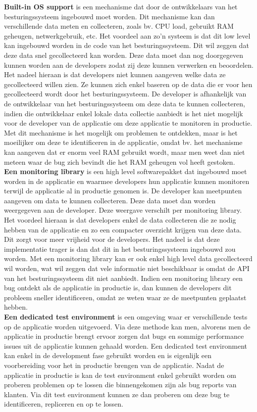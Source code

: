 \textbf{Built-in OS support} is een mechanisme dat door de ontwikkelaars van het besturingssysteem ingebouwd moet worden. Dit mechanisme kan dan verschillende data meten en collecteren, zoals bv. CPU load, gebruikt RAM geheugen, netwerkgebruik, etc. Het voordeel aan zo'n systeem is dat dit low level kan ingebouwd worden in de code van het besturingssysteem. Dit wil zeggen dat deze data snel gecollecteerd kan worden. Deze data moet dan nog doorgegeven kunnen worden aan de developers zodat zij deze kunnen verwerken en beoordelen. Het nadeel hieraan is dat developers niet kunnen aangeven welke data ze gecollecteerd willen zien. Ze kunnen zich enkel baseren op de data die er voor hen gecollecteerd wordt door het besturingssysteem. De developer is afhankelijk van de ontwikkelaar van het besturingssysteem om deze data te kunnen collecteren, indien die ontwikkelaar enkel lokale data collectie aanbiedt is het niet mogelijk voor de developer van de applicatie om deze applicatie te monitoren in productie. Met dit mechanisme is het mogelijk om problemen te ontdekken, maar is het moeilijker om deze te identificeren in de applicatie, omdat bv. het mechanisme kan aangeven dat er enorm veel RAM gebruikt wordt, maar men weet dan niet meteen waar de bug zich bevindt die het RAM geheugen vol heeft gestoken.\\

\textbf{Een monitoring library} is een high level softwarepakket dat ingebouwd moet worden in de applicatie en waarmee developers hun applicatie kunnen monitoren terwijl de applicatie al in productie genomen is. De developer kan meetpunten aangeven om data te kunnen collecteren. Deze data moet dan worden weergegeven aan de developer. Deze weergave verschilt per monitoring library. Het voordeel hieraan is dat developers enkel de data collecteren die ze nodig hebben van de applicatie en zo een compacter overzicht krijgen van deze data. Dit zorgt voor meer vrijheid voor de developers. Het nadeel is dat deze implementatie trager is dan dat dit in het besturingssysteem ingebouwd zou worden. Met een monitoring library kan er ook enkel high level data gecollecteerd wil worden, wat wil zeggen dat vele informatie niet beschikbaar is omdat de API van het besturingssysteem dit niet aanbiedt. Indien een monitoring library een bug ontdekt als de applicatie in productie is, dan kunnen de developers dit probleem sneller identificeren, omdat ze weten waar ze de meetpunten geplaatst hebben. \\

\textbf{Een dedicated test environment} is een omgeving waar er verschillende tests op de applicatie worden uitgevoerd. Via deze methode kan men, alvorens men de applicatie in productie brengt ervoor zorgen dat bugs en sommige performance issues uit de applicatie kunnen gehaald worden. Een dedicated test environment kan enkel in de development fase gebruikt worden en is eigenlijk een voorbereiding voor het in productie brengen van de applicatie. Nadat de applicatie in productie is kan de test environment enkel gebruikt worden om proberen problemen op te lossen die binnengekomen zijn als bug reports van klanten. Via dit test environment kunnen ze dan proberen om deze bug te identificeren, repliceren en op te lossen. \\


